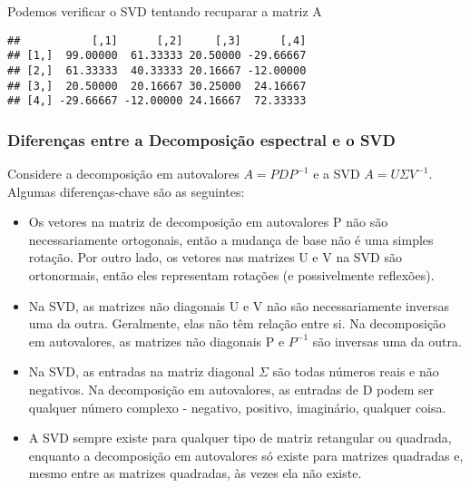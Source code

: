 \documentclass[
]{article}
\newenvironment{Shaded}{\begin{snugshade}}{\end{snugshade}}
\newcommand{\FunctionTok}[1]{\textcolor[rgb]{0.13,0.29,0.53}{\textbf{#1}}}
\newcommand{\NormalTok}[1]{#1}
\newcommand{\SpecialCharTok}[1]{\textcolor[rgb]{0.81,0.36,0.00}{\textbf{#1}}}
\begin{document}
Podemos verificar o SVD tentando recuparar a matriz A

\begin{Shaded}
\end{Shaded}

\begin{verbatim}
##           [,1]      [,2]     [,3]      [,4]
## [1,]  99.00000  61.33333 20.50000 -29.66667
## [2,]  61.33333  40.33333 20.16667 -12.00000
## [3,]  20.50000  20.16667 30.25000  24.16667
## [4,] -29.66667 -12.00000 24.16667  72.33333
\end{verbatim}

\hypertarget{diferenuxe7as-entre-a-decomposiuxe7uxe3o-espectral-e-o-svd}{%
\subsubsection{Diferenças entre a Decomposição espectral e o
SVD}\label{diferenuxe7as-entre-a-decomposiuxe7uxe3o-espectral-e-o-svd}}

Considere a decomposição em autovalores \(A=PDP^{-1}\) e a SVD
\(A=U \Sigma V^{-1}\). Algumas diferenças-chave são as seguintes:

\begin{itemize}
\item
  Os vetores na matriz de decomposição em autovalores P não são
  necessariamente ortogonais, então a mudança de base não é uma simples
  rotação. Por outro lado, os vetores nas matrizes U e V na SVD são
  ortonormais, então eles representam rotações (e possivelmente
  reflexões).
\item
  Na SVD, as matrizes não diagonais U e V não são necessariamente
  inversas uma da outra. Geralmente, elas não têm relação entre si. Na
  decomposição em autovalores, as matrizes não diagonais P e \(P^{-1}\)
  são inversas uma da outra.
\item
  Na SVD, as entradas na matriz diagonal \(\Sigma\) são todas números
  reais e não negativos. Na decomposição em autovalores, as entradas de
  D podem ser qualquer número complexo - negativo, positivo, imaginário,
  qualquer coisa.
\item
  A SVD sempre existe para qualquer tipo de matriz retangular ou
  quadrada, enquanto a decomposição em autovalores só existe para
  matrizes quadradas e, mesmo entre as matrizes quadradas, às vezes ela
  não existe.
\end{itemize}
\end{document}
